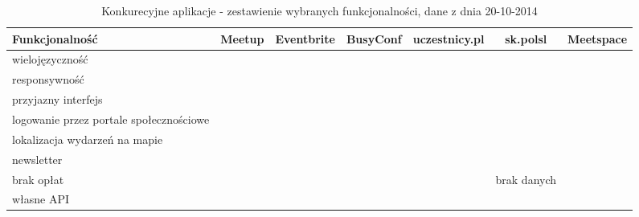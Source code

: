 \newcommand{\cmark}{\ding{51}}
\newcommand{\xmark}{\ding{55}}

\begin{landscape}
  \begin{table}[h]
    \begin{tabular}{|l|c|c|c|c|c|c|}
      \hline
Funkcjonalność                          & Meetup & Eventbrite & BusyConf & uczestnicy.pl & sk.polsl    & \textbf{Meetspace} \\ \hline
wielojęzyczność                         & \cmark & \cmark     & \xmark   & \xmark        & \xmark      & \cmark             \\ \hline
responsywność                           & \xmark & \cmark     & \cmark   & \cmark        & \xmark      & \cmark             \\ \hline
przyjazny interfejs                     & \cmark & \cmark     & \cmark   & \xmark        & \xmark      & \cmark             \\ \hline
logowanie przez portale społecznościowe & \cmark & \xmark     & \xmark   & \cmark        & \xmark      & \cmark             \\ \hline
lokalizacja wydarzeń na mapie           & \xmark & \cmark     & \cmark   & \cmark        & \xmark      & \cmark             \\ \hline
newsletter                              & \cmark & \xmark     & \xmark   & \xmark        & \xmark      & \cmark             \\ \hline
brak opłat                              & \xmark & \cmark     & \xmark   & \xmark        & brak danych & \cmark             \\ \hline
własne API                              & \cmark & \xmark     & \xmark   & \xmark        & \xmark      & \cmark             \\ \hline
    \end{tabular}
    \caption{Konkurecyjne aplikacje - zestawienie wybranych funkcjonalności, dane z dnia 20-10-2014}
  \end{table}
\end{landscape}
